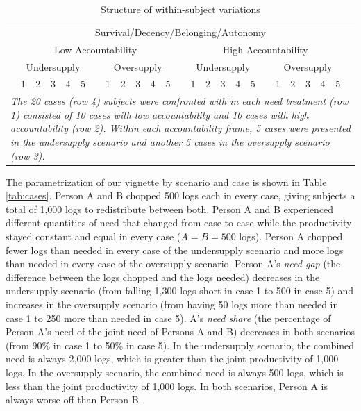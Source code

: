 \documentclass[egregdoesnotlikesansseriftitles]{scrartcl}
\begin{document}
\begin{table}[ht]
   \centering
   \caption{Structure of within-subject variations}\label{tab:structure}
   \begin{tabular}{lccccclccccclccccclcccccc}\\[0.5ex]\hline
      & \multicolumn{23}{c}{Survival/Decency/Belonging/Autonomy}                                                                                                &   \\\cline{2-24}
      & \multicolumn{11}{c}{Low Accountability}                                  &   & \multicolumn{11}{c}{High Accountability}                                 &   \\\cline{2-12}\cline{14-24}
      & \multicolumn{5}{c}{Undersupply}   &   & \multicolumn{5}{c}{Oversupply}   &   & \multicolumn{5}{c}{Undersupply}   &   & \multicolumn{5}{c}{Oversupply}   &   \\\cline{2-6}\cline{8-12}\cline{14-18}\cline{20-24}
      & 1   & 2   & 3   & 4   & 5         &   & 1   & 2   & 3   & 4   & 5        &   & 1   & 2   & 3   & 4   & 5         &   & 1   & 2   & 3   & 4   & 5        &   \\\hline
   \multicolumn{25}{p{14cm}}{\footnotesize{\textit{The 20 cases (row 4) subjects were confronted with in each need treatment (row 1) consisted of 10 cases with low accountability and 10 cases with high accountability (row 2). Within each accountability frame, 5 cases were presented in the undersupply scenario and another 5 cases in the oversupply scenario (row 3).}}}
   \end{tabular}
\end{table}

The parametrization of our vignette by scenario and case is shown in Table \ref{tab:cases}.
Person A and B chopped 500 logs each in every case, giving subjects a total of 1,000 logs to redistribute between both.
Person A and B experienced different quantities of need that changed from case to case while the productivity stayed constant and equal in every case ($A=B=500$ logs).
Person A chopped fewer logs than needed in every case of the undersupply scenario and more logs than needed in every case of the oversupply scenario.
Person A's \textit{need gap} (the difference between the logs chopped and the logs needed) decreases in the undersupply scenario (from falling 1,300 logs short in case 1 to 500 in case 5) and increases in the oversupply scenario (from having 50 logs more than needed in case 1 to 250 more than needed in case 5).
A's \textit{need share} (the percentage of Person A's need of the joint need of Persons A and B) decreases in both scenarios (from 90\% in case 1 to 50\% in case 5).
In the undersupply scenario, the combined need is always 2,000 logs, which is greater than the joint productivity of 1,000 logs.
In the oversupply scenario, the combined need is always 500 logs, which is less than the joint productivity of 1,000 logs.
In both scenarios, Person A is always worse off than Person B.
\end{document}
